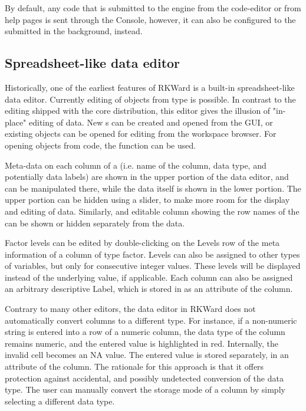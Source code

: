 By default, any code that is submitted to the
 engine from the code-editor or from help
pages is sent through the  Console,
however, it can also be configured to the submitted in the background,
instead.

\subsection{Spreadsheet-like data editor}
\label{sec:spreadsheet}

Historically, one of the earliest
features of RKWard is a built-in spreadsheet-like data editor.
Currently editing of  objects from type
 is possible. In contrast to the  editing shipped
with the  core distribution, this editor
gives the illusion of "in-place" editing of data. New s can
be created and opened from the GUI, or existing objects can be opened
for editing from the workspace browser. For opening objects from
 code, the function
 can be used.

Meta-data on each column of a  (i.e. name of the column, data
type, and potentially data labels) are shown in the upper portion of
the data editor, and can be manipulated there, while the data itself is
shown in the lower portion. The upper portion can be hidden using a
slider, to make more room for the display and editing of data.
Similarly, and editable column showing the row names of the 
can be shown or hidden separately from the data.

Factor levels can be edited by double-clicking on the
Levels row of the meta information of a
column of type factor. Levels can also be assigned to other types of
variables, but only for consecutive integer values. These levels will
be displayed instead of the underlying value, if applicable. Each
column can also be assigned an arbitrary descriptive
Label, which is stored in
 as an attribute of the column.

Contrary to many other editors, the data editor in RKWard does not
automatically convert columns to a different type. For instance, if a
non-numeric string is entered into a row of a numeric column, the data
type of the column remains numeric, and the entered value is
highlighted in red. Internally, the invalid cell becomes an NA value.
The entered value is stored separately, in an attribute of the column.
The rationale for this approach is that it offers protection against
accidental, and possibly undetected conversion of the data type. The
user can manually convert the storage mode of a column by simply
selecting a different data type.

